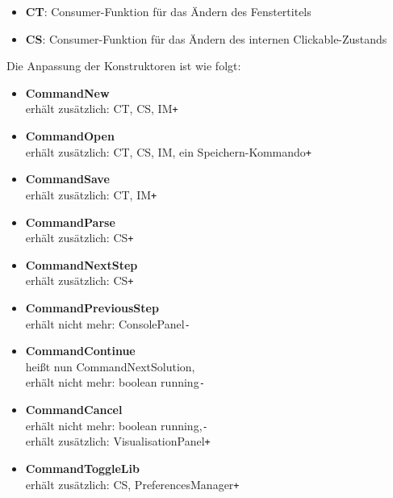 \documentclass[parskip=full,11pt,twoside]{scrartcl}
\begin{document}
\begin{itemize}
	\item \textbf{CT}: Consumer-Funktion für das Ändern des Fenstertitels
	\item \textbf{CS}: Consumer-Funktion für das Ändern des internen Clickable-Zustands
\end{itemize}

Die Anpassung der Konstruktoren ist wie folgt:
\begin{itemize}
	\item \textbf{CommandNew}\\\hspace*{1cm}erhält zusätzlich: CT, CS, IM\hfill \texttt{+}
	\item \textbf{CommandOpen}\\\hspace*{1cm}erhält zusätzlich: CT, CS, IM, ein Speichern-Kommando\hfill\texttt{+}
	\item \textbf{CommandSave}\\\hspace*{1cm}erhält zusätzlich: CT, IM\hfill\texttt{+}
	\item \textbf{CommandParse}\\\hspace*{1cm}erhält zusätzlich: CS\hfill\texttt{+}
	\item \textbf{CommandNextStep}\\\hspace*{1cm}erhält zusätzlich: CS\hfill\texttt{+}
	\item \textbf{CommandPreviousStep}\\\hspace*{1cm}erhält nicht mehr: ConsolePanel\hfill\texttt{-}
	\item \textbf{CommandContinue}\\\hspace*{1cm}heißt nun CommandNextSolution,
								  \\\hspace*{1cm}erhält nicht mehr: boolean running\hfill\texttt{-}
	\item \textbf{CommandCancel}\\\hspace*{1cm}erhält nicht mehr: boolean running,\hfill\texttt{-}
								\\\hspace*{1cm}erhält zusätzlich: VisualisationPanel\hfill\texttt{+}
	\item \textbf{CommandToggleLib}\\\hspace*{1cm}erhält zusätzlich: CS, PreferencesManager\hfill\texttt{+}

\end{itemize}
\end{document}

